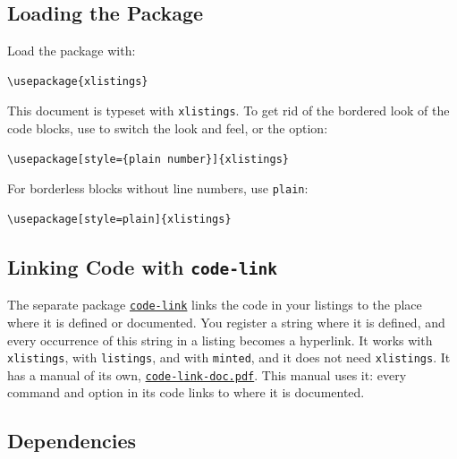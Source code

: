\documentclass[a4paper,10pt,parskip=half,numbers=noenddot]{scrartcl}
\let\T\texttt
\def\argref#1#2{\CodeLinkRef[group=opt]{#1}}
\begin{document}
\xlstmintedwithlangbadge


\subsection{Loading the Package}\label{sec:loading-pkg}

Load the package with:

\begin{verbatim}
\usepackage{xlistings}
\end{verbatim}

This document is typeset with \T{xlistings}.
To get rid of the bordered look of the code blocks, use  to switch the look and feel, or the \argref{style}{style} option:

\begin{verbatim}
\usepackage[style={plain number}]{xlistings}
\end{verbatim}

For borderless blocks without line numbers, use \T{plain}:

\begin{verbatim}
\usepackage[style=plain]{xlistings}
\end{verbatim}

\subsection{Linking Code with \texorpdfstring{\T{code-link}}{code-link}}\label{sec:code-link}

The separate package \href{https://ctan.org/pkg/code-link}{\T{code-link}} links the code in your listings to the place where it is defined or documented. You register a string where it is defined, and every occurrence of this string in a listing becomes a hyperlink. It works with \T{xlistings}, with \T{listings}, and with \T{minted}, and it does not need \T{xlistings}. It has a manual of its own, \href{https://github.com/EagleoutIce/xlistings/blob/gh-pages/build/code-link-doc.pdf}{\T{code-link-doc.pdf}}. This manual uses it: every command and option in its code links to where it is documented.

\subsection{Dependencies}
\end{document}
